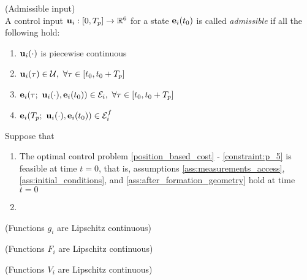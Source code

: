 \begin{bw_box}
\begin{definition} (Admissible input)\\

  A control input $\bm{\mathbf{u}}_i : [0, T_p] \to \mathbb{R}^6$ for a state
  $\bm{\mathbf{e}}_i(t_0)$ is called \textit{admissible} if all the following hold:

  \begin{enumerate}
    \item $\bm{\mathbf{u}}_i(\cdot)$ is piecewise continuous
    \item $\vect{u}_i(\tau) \in \mathcal{U},\ \forall \tau \in [t_0, t_0 + T_p]$
    \item $\bm{\mathbf{e}}_i(\tau;\ \bm{\mathbf{u}}_i(\cdot), \bm{\mathbf{e}}_i(t_0)) \in \mathcal{E}_i,\ \forall \tau \in [t_0, t_0 + T_p]$
    \item $\bm{\mathbf{e}}_i(T_p;\ \bm{\mathbf{u}}_i(\cdot), \bm{\mathbf{e}}_i(t_0)) \in \mathcal{E}_i^f$
  \end{enumerate}

\end{definition}
\end{bw_box}


\begin{bw_box}
\begin{theorem} Suppose that

  \begin{enumerate}
    \item The optimal control problem \eqref{position_based_cost} -
      \eqref{constraint:p_5} is feasible at time $t=0$, that is, assumptions
      \eqref{ass:measurements_access}, \eqref{ass:initial_conditions}, and
      \eqref{ass:after_formation_geometry} hold at time $t=0$
    \item
  \end{enumerate}

\end{theorem}
\end{bw_box}



\begin{gg_box}
\begin{assumption} (Functions $g_i$ are Lipschitz continuous)
  \label{ass:g_i_Lipschitz}
\end{assumption}
\end{gg_box}

\begin{gg_box}
\begin{assumption} (Functions $F_i$ are Lipschitz continuous)
  \label{ass:F_i_Lipschitz}
\end{assumption}
\end{gg_box}


\begin{gg_box}
\begin{assumption} (Functions $V_i$ are Lipschitz continuous)
  \label{ass:V_i_Lipschitz}
\end{assumption}
\end{gg_box}
